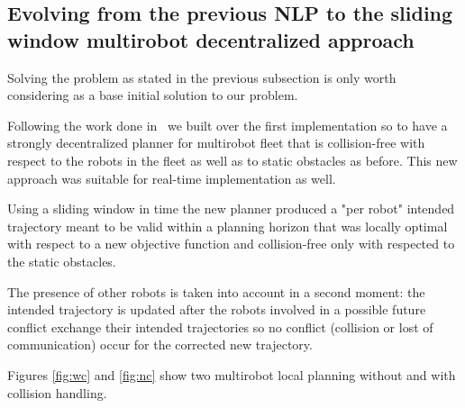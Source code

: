 \subsection{Evolving from the previous NLP to the sliding window multirobot decentralized approach}

Solving the problem as stated in the previous subsection is only worth considering as a base initial solution to our problem.

Following the work done in~\cite{Defoort2007a} we built over the first implementation so to have a strongly decentralized planner for multirobot fleet that is collision-free with respect to the robots in the fleet as well as to static obstacles as before. This new approach was suitable for real-time implementation as well.

Using a sliding window in time the new planner produced a "per robot" intended trajectory meant to be valid within a planning horizon that was locally optimal with respect to a new objective function and collision-free only with respected to the static obstacles.

The presence of other robots is taken into account in a second moment: the intended trajectory is updated after the robots involved in a possible future conflict exchange their intended trajectories so no conflict (collision or lost of communication) occur for the corrected new trajectory.

Figures \ref{fig:wc} and \ref{fig:nc} show two multirobot local planning without and with collision handling.

